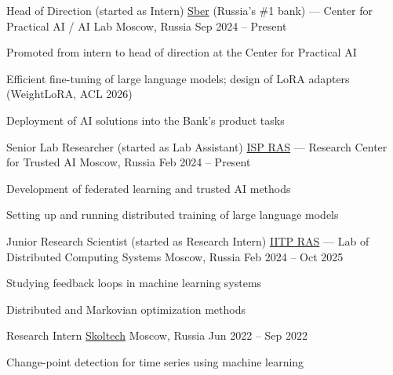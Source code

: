 \begin{cventries}
  \cventry
    {Head of Direction \textnormal{(started as Intern)}} %
    {\href{https://sberlabs.com/laboratories/sber-ai-lab}{Sber} (Russia's \#1 bank) — Center for Practical AI / AI Lab} %
    {Moscow, Russia} %
    {Sep 2024 -- Present} %
    {
      \begin{cvitems}
        \item {Promoted from intern to head of direction at the Center for Practical AI}
        \item {Efficient fine-tuning of large language models; design of LoRA adapters (WeightLoRA, ACL 2026)}
        \item {Deployment of AI solutions into the Bank's product tasks}
      \end{cvitems}
    }

  \cventry
    {Senior Lab Researcher \textnormal{(started as Lab Assistant)}} %
    {\href{https://www.ispras.ru/en/}{ISP RAS} — Research Center for Trusted AI} %
    {Moscow, Russia} %
    {Feb 2024 -- Present} %
    {
      \begin{cvitems}
        \item {Development of federated learning and trusted AI methods}
        \item {Setting up and running distributed training of large language models}
      \end{cvitems}
    }

  \cventry
    {Junior Research Scientist \textnormal{(started as Research Intern)}} %
    {\href{http://iitp.ru/ru/researchlabs/1034.htm}{IITP RAS} — Lab of Distributed Computing Systems} %
    {Moscow, Russia} %
    {Feb 2024 -- Oct 2025} %
    {
      \begin{cvitems}
        \item {Studying feedback loops in machine learning systems}
        \item {Distributed and Markovian optimization methods}
      \end{cvitems}
    }

  \cventry
    {Research Intern} %
    {\href{https://new.skoltech.ru}{Skoltech}} %
    {Moscow, Russia} %
    {Jun 2022 -- Sep 2022} %
    {
      \begin{cvitems}
        \item {Change-point detection for time series using machine learning}
      \end{cvitems}
    }

\end{cventries}
